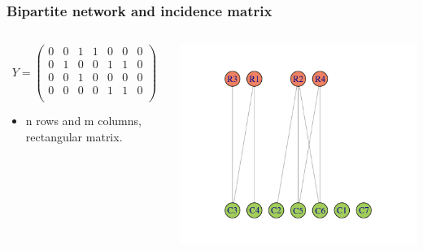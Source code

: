 \documentclass[compress,10pt]{beamer}
\begin{document}
\begin{frame}
\frametitle{Bipartite network and incidence matrix}
 \begin{columns}
 \begin{column}{.45\paperwidth}
$$Y=\left(
\begin{array}{rrrrrrr}
0 &   0 &   1 &   1 &   0 &   0 &   0 \\ 
   0 &   1 &   0 &   0 &   1 &   1 &   0 \\ 
   0 &   0 &   1 &   0 &   0 &   0 &   0 \\ 
  0 &   0 &   0 &   0 &   1 &   1 &   0 \\ 
\end{array}\right)
$$


\begin{itemize}
 \item n rows and m columns, rectangular matrix.
 \end{itemize}



\end{column}

\begin{column}{.5\paperwidth}

\includegraphics[scale=.5]{plots/graphe_bipartite.png}

\end{column}

\end{columns}



\end{frame}
\end{document}
